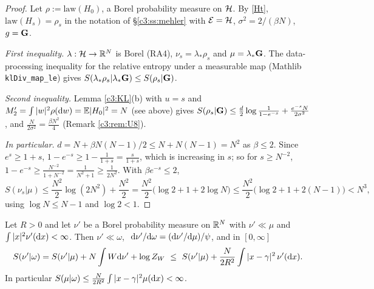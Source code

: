 \begin{proof}
Let $\rho:=\mathrm{law}(H_0)$, a Borel probability measure on $\mathcal{H}$. By \eqref{Ht}, $\mathrm{law}(H_s)=\rho_s$ in the notation of \S\ref{c3:ss:mehler} with $\mathcal E=\mathcal{H}$, $\sigma^2=2/(\beta N)$, $g=\mathbf{G}$.

\emph{First inequality.} $\lambda:\mathcal{H}\to\mathbb{R}^N$ is Borel (RA4), $\nu_s=\lambda_*\rho_s$ and $\mu=\lambda_*\mathbf{G}$. The data-processing inequality for the relative entropy under a measurable map (Mathlib \texttt{klDiv\_map\_le}) gives $S(\lambda_*\rho_s|\lambda_*\mathbf{G})\le S(\rho_s|\mathbf{G})$.

\emph{Second inequality.} Lemma \ref{c3:KL}(b) with $u=s$ and $M_2'=\int|w|^2\rho(\mathrm{d} w)=\mathbb{E}|H_0|^2=N$ (see above) gives
$S(\rho_s|\mathbf{G})\le\frac d2\log\frac1{1-e^{-s}}+\frac{e^{-s}N}{2\sigma^2}$, and $\frac{N}{2\sigma^2}=\frac{\beta N^2}4$ (Remark \ref{c3:rem:U8}).

\emph{In particular.} $d=N+\beta N(N-1)/2\le N+N(N-1)=N^2$ as $\beta\le2$. Since $e^{s}\ge1+s$, $1-e^{-s}\ge1-\frac1{1+s}=\frac s{1+s}$, which is increasing in $s$; so for $s\ge N^{-2}$, $1-e^{-s}\ge\frac{N^{-2}}{1+N^{-2}}=\frac1{N^2+1}\ge\frac1{2N^2}$. With $\beta e^{-s}\le2$,
\[
S(\nu_s|\mu)\le\frac{N^2}2\log(2N^2)+\frac{N^2}2=\frac{N^2}{2}\big(\log2+1+2\log N\big)\le\frac{N^2}2\big(\log 2+1+2(N-1)\big)<N^3,
\]
using $\log N\le N-1$ and $\log2<1$.
\end{proof}

\begin{lemma}\label{lem:ref}
Let $R>0$ and let $\nu'$ be a Borel probability measure on $\mathbb{R}^N$ with $\nu'\ll\mu$ and $\int|x|^2\nu'(\mathrm{d} x)<\infty$. Then $\nu'\ll\omega$, $\ \rd\nu'/\rd\omega=(\rd\nu'/\rd\mu)/\psi$, and in $[0,\infty]$
\[
S(\nu'|\omega)=S(\nu'|\mu)+N\int W\rd\nu'+\log Z_W\ \le\ S(\nu'|\mu)+\frac{N}{2R^2}\int|x-\gamma|^2\,\nu'(\rd x).
\]
In particular $S(\mu|\omega)\le\frac{N}{2R^2}\int|x-\gamma|^2\mu(\mathrm{d} x)<\infty$.
\end{lemma}

